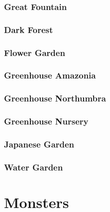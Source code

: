 \subsection*{Great Fountain}
\subsection*{Dark Forest}
\subsection*{Flower Garden}
\subsection*{Greenhouse Amazonia}
\subsection*{Greenhouse Northumbra}
\subsection*{Greenhouse Nursery}
\subsection*{Japanese Garden}
\subsection*{Water Garden}

\chapter{Monsters}
